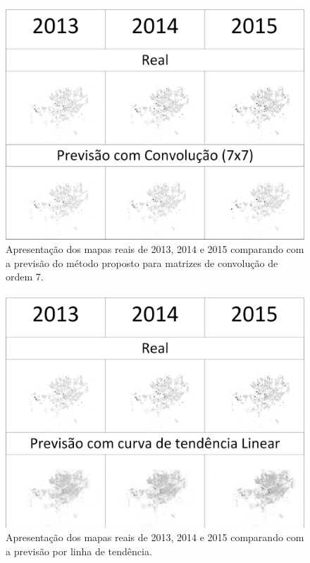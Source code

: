 \begin{figure}[H]
	\centering	
	\includegraphics[scale=0.29]{Figuras/7x7vsReal.png}
	\caption{Apresentação dos mapas reais de 2013, 2014 e 2015 comparando com a previsão do método proposto para matrizes de convolução de ordem 7.}
	\label{fig:Results7x7}
\end{figure}
\begin{figure}[H]
	\centering	
	\includegraphics[scale=0.29]{Figuras/CTvsReal.png}
	\caption{Apresentação dos mapas reais de 2013, 2014 e 2015 comparando com a previsão por linha de tendência.}
	\label{fig:ResultsCT}
\end{figure}

